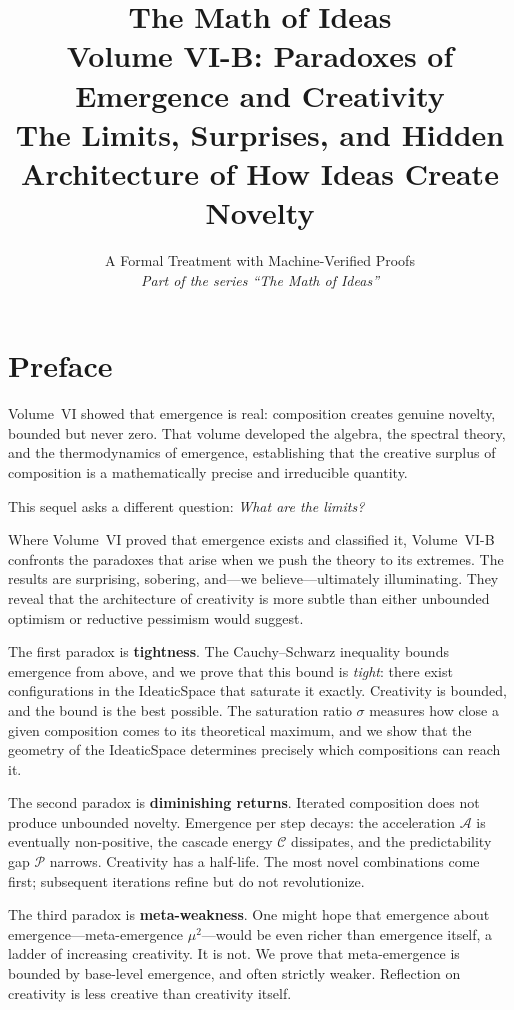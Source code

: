 \documentclass[11pt,oneside]{book}
\title{\Huge\bfseries The Math of Ideas\\[0.3em]
\LARGE Volume VI-B: Paradoxes of Emergence and Creativity\\[0.5em]
\Large The Limits, Surprises, and Hidden Architecture of How Ideas Create Novelty}
\author{A Formal Treatment with Machine-Verified Proofs\\[0.3em]
\normalsize\textit{Part of the series ``The Math of Ideas''}}
\date{}
\theoremstyle{definition}
\theoremstyle{plain}
\theoremstyle{remark}
\newcommand{\satrat}{\sigma}                       %
\newcommand{\meta}{\mu^2}                          %
\newcommand{\accel}{\mathcal{A}}                   %
\newcommand{\prgap}{\mathcal{P}}                   %
\newcommand{\cascade}{\mathcal{C}}                 %
\begin{document}
\maketitle

\frontmatter

\chapter*{Preface}

Volume~VI showed that emergence is real: composition creates genuine novelty,
bounded but never zero. That volume developed the algebra, the spectral theory,
and the thermodynamics of emergence, establishing that the creative surplus of
composition is a mathematically precise and irreducible quantity.

This sequel asks a different question: \emph{What are the limits?}

Where Volume~VI proved that emergence exists and classified it, Volume~VI-B
confronts the paradoxes that arise when we push the theory to its extremes.
The results are surprising, sobering, and---we believe---ultimately
illuminating. They reveal that the architecture of creativity is more subtle
than either unbounded optimism or reductive pessimism would suggest.

The first paradox is \textbf{tightness}. The Cauchy--Schwarz inequality bounds
emergence from above, and we prove that this bound is \emph{tight}: there exist
configurations in the IdeaticSpace that saturate it exactly. Creativity is
bounded, and the bound is the best possible. The saturation ratio
$\satrat$ measures how close a given composition comes to its theoretical
maximum, and we show that the geometry of the IdeaticSpace determines
precisely which compositions can reach it.

The second paradox is \textbf{diminishing returns}. Iterated composition does
not produce unbounded novelty. Emergence per step decays: the acceleration
$\accel$ is eventually non-positive, the cascade energy $\cascade$ dissipates,
and the predictability gap $\prgap$ narrows. Creativity has a half-life. The
most novel combinations come first; subsequent iterations refine but do not
revolutionize.

The third paradox is \textbf{meta-weakness}. One might hope that
emergence about emergence---meta-emergence $\meta$---would be even richer than
emergence itself, a ladder of increasing creativity. It is not. We prove that
meta-emergence is bounded by base-level emergence, and often strictly weaker.
Reflection on creativity is less creative than creativity itself.
\end{document}
